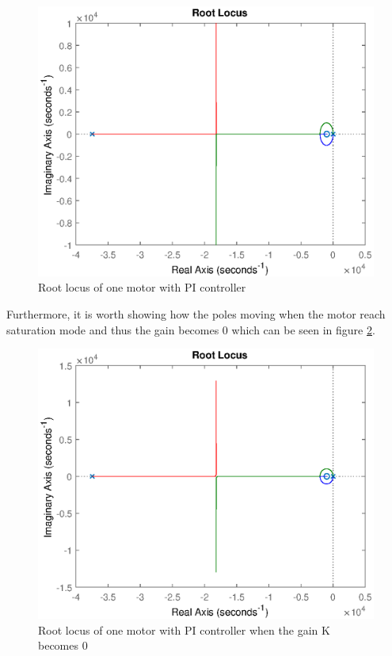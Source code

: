 \begin{figure}[H]
	\centering
	\includegraphics[width=0.7\linewidth]{figures/rloci_new}
	\caption{Root locus of one motor with PI controller}
	\label{fig:rlocus33}
\end{figure}
Furthermore, it is worth showing how the poles moving when the motor reach saturation mode and thus the gain becomes 0 which can be seen in figure \ref{fig:rlocus44}.
\begin{figure}[H]
	\centering
	\includegraphics[width=0.7\linewidth]{figures/stauration_motor_mode}
	\caption{Root locus of one motor with PI controller when the gain K becomes 0}
	\label{fig:rlocus44}
\end{figure}

